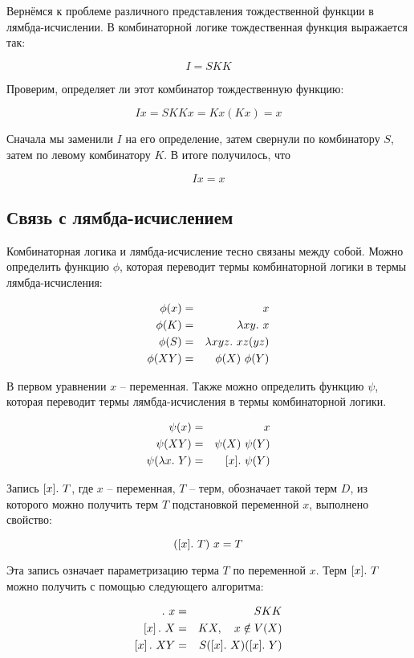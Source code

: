 Вернёмся к проблеме различного представления тождественной функции в
лямбда-исчислении. В комбинаторной логике тождественная функция
выражается так:

\[I = SKK\]

Проверим, определяет ли этот комбинатор тождественную функцию:

\[Ix = SKKx = Kx(Kx) = x\]

Сначала мы заменили $I$ на его определение, затем свернули по
комбинатору $S$, затем по левому комбинатору $K$. В итоге получилось,
что

\[Ix = x\]

\subsection{Связь с лямбда-исчислением}

Комбинаторная логика и лямбда-исчисление тесно связаны между собой.
Можно определить функцию $\phi$, которая переводит термы комбинаторной
логики в термы лямбда-исчисления:

\begin{eqnarray*}
\phi(x) &=& x \\
\phi(K) &=& \lambda xy .\  x \\
\phi(S) &=& \lambda xyz .\  xz(yz) \\
\phi(XY) &=& \phi(X)\ \phi(Y) \\
\end{eqnarray*}

В первом уравнении $x$ -- переменная. Также можно определить функцию
$\psi$, которая переводит термы лямбда-исчисления в термы комбинаторной
логики.

\begin{eqnarray*}
\psi(x) &=& x \\
\psi(XY) &=& \psi(X)\ \psi(Y) \\
\psi(\lambda x .\  Y) &=& [x] .\  \psi(Y) \\
\end{eqnarray*}

Запись $[x].\  T$, где $x$ -- переменная, $T$ -- терм, обозначает такой
терм $D$, из которого можно получить терм $T$ подстановкой переменной
$x$, выполнено свойство:

\[([x].\  T)\ x = T\]

Эта запись означает параметризацию терма $T$ по переменной $x$. Терм
$[x].\  T$ можно получить с помощью следующего алгоритма:

\begin{eqnarray*}
[x] \D x &=& SKK \\ 
\left[x\right] \D X &=& KX, \quad x \notin V(X) \\
\left[x\right] \D XY &=& S([x] \D X)([x]\D Y) \\
\end{eqnarray*}

